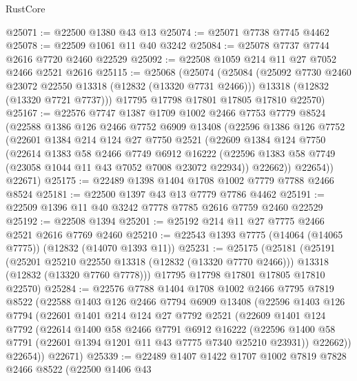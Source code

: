 \begin{lexlean}{RustCore}
\begin{coremodule}
@25071 := @22500 @1380 @43 @13
@25074 := @25071 @7738 @7745 @4462
@25078 := @22509 @1061 @11 @40 @3242
@25084 := @25078 @7737 @7744 @2616 @7720 @2460 @22529
@25092 := @22508 @1059 @214 @11 @27 @7052 @2466 @2521 @2616
@25115 := @25068
    (@25074
      (@25084
        (@25092 @7730 @2460 @23072 @22550 @13318 (@12832 (@13320 @7731 @2466)))
        @13318
        (@12832 (@13320 @7721 @7737)))
      @17795
      @17798
      @17801
      @17805
      @17810
      @22570)
@25167 := @22576
    @7747
    @1387
    @1709
    @1002
    @2466
    @7753
    @7779
    @8524
    (@22588
      @1386
      @126
      @2466
      @7752
      @6909
      @13408
      (@22596
        @1386
        @126
        @7752
        (@22601
          @1384
          @214
          @124
          @27
          @7750
          @2521
          (@22609
            @1384
            @124
            @7750
            (@22614
              @1383
              @58
              @2466
              @7749
              @6912
              @16222
              (@22596 @1383 @58 @7749 (@23058 @1044 @11 @43 @7052 @7008 @23072 @22934))
              @22662))
          @22654))
      @22671)
@25175 := @22489 @1398 @1404 @1708 @1002 @7779 @7788 @2466 @8524
@25181 := @22500 @1397 @43 @13 @7779 @7786 @4462
@25191 := @22509 @1396 @11 @40 @3242 @7778 @7785 @2616 @7759 @2460 @22529
@25192 := @22508 @1394
@25201 := @25192 @214 @11 @27 @7775 @2466 @2521 @2616 @7769 @2460
@25210 := @22543 @1393 @7775 (@14064 (@14065 @7775)) (@12832 (@14070 @1393 @11))
@25231 := @25175
    (@25181
      (@25191
        (@25201 @25210 @22550 @13318 (@12832 (@13320 @7770 @2466)))
        @13318
        (@12832 (@13320 @7760 @7778)))
      @17795
      @17798
      @17801
      @17805
      @17810
      @22570)
@25284 := @22576
    @7788
    @1404
    @1708
    @1002
    @2466
    @7795
    @7819
    @8522
    (@22588
      @1403
      @126
      @2466
      @7794
      @6909
      @13408
      (@22596
        @1403
        @126
        @7794
        (@22601
          @1401
          @214
          @124
          @27
          @7792
          @2521
          (@22609
            @1401
            @124
            @7792
            (@22614
              @1400
              @58
              @2466
              @7791
              @6912
              @16222
              (@22596 @1400 @58 @7791 (@22601 @1394 @1201 @11 @43 @7775 @7340 @25210 @23931))
              @22662))
          @22654))
      @22671)
@25339 := @22489
    @1407
    @1422
    @1707
    @1002
    @7819
    @7828
    @2466
    @8522
    (@22500
      @1406
      @43

\end{coremodule}
\end{lexlean}
